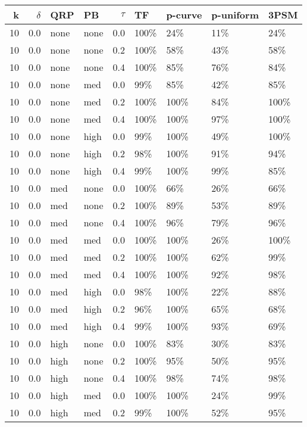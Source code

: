 \begin{longtable}{rrllrllll}
  \hline
{k} & {$\delta$} & {QRP} & {PB} & {$\tau$} & TF & p-curve & p-uniform & 3PSM \\ 
  \hline
10 & 0.0 & none & none & 0.0 & 100\% & 24\% & 11\% & 24\% \\ 
  10 & 0.0 & none & none & 0.2 & 100\% & 58\% & 43\% & 58\% \\ 
  10 & 0.0 & none & none & 0.4 & 100\% & 85\% & 76\% & 84\% \\ 
  10 & 0.0 & none & med & 0.0 & 99\% & 85\% & 42\% & 85\% \\ 
  10 & 0.0 & none & med & 0.2 & 100\% & 100\% & 84\% & 100\% \\ 
  10 & 0.0 & none & med & 0.4 & 100\% & 100\% & 97\% & 100\% \\ 
  10 & 0.0 & none & high & 0.0 & 99\% & 100\% & 49\% & 100\% \\ 
  10 & 0.0 & none & high & 0.2 & 98\% & 100\% & 91\% & 94\% \\ 
  10 & 0.0 & none & high & 0.4 & 99\% & 100\% & 99\% & 85\% \\ 
  10 & 0.0 & med & none & 0.0 & 100\% & 66\% & 26\% & 66\% \\ 
  10 & 0.0 & med & none & 0.2 & 100\% & 89\% & 53\% & 89\% \\ 
  10 & 0.0 & med & none & 0.4 & 100\% & 96\% & 79\% & 96\% \\ 
  10 & 0.0 & med & med & 0.0 & 100\% & 100\% & 26\% & 100\% \\ 
  10 & 0.0 & med & med & 0.2 & 100\% & 100\% & 62\% & 99\% \\ 
  10 & 0.0 & med & med & 0.4 & 100\% & 100\% & 92\% & 98\% \\ 
  10 & 0.0 & med & high & 0.0 & 98\% & 100\% & 22\% & 88\% \\ 
  10 & 0.0 & med & high & 0.2 & 96\% & 100\% & 65\% & 68\% \\ 
  10 & 0.0 & med & high & 0.4 & 99\% & 100\% & 93\% & 69\% \\ 
  10 & 0.0 & high & none & 0.0 & 100\% & 83\% & 30\% & 83\% \\ 
  10 & 0.0 & high & none & 0.2 & 100\% & 95\% & 50\% & 95\% \\ 
  10 & 0.0 & high & none & 0.4 & 100\% & 98\% & 74\% & 98\% \\ 
  10 & 0.0 & high & med & 0.0 & 100\% & 100\% & 24\% & 99\% \\ 
  10 & 0.0 & high & med & 0.2 & 99\% & 100\% & 52\% & 95\% \\ 

\end{longtable}

